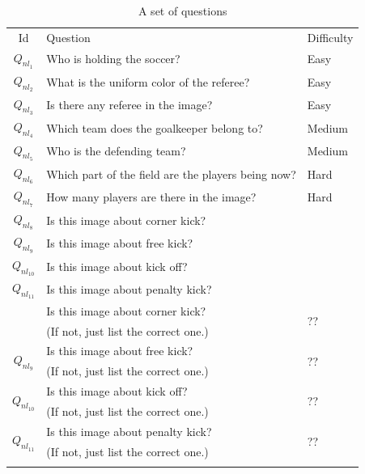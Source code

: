 \begin{table}[thb]
	\renewcommand{\arraystretch}{1}
	\begin{center}
		\footnotesize		
		\begin{tabular}{c|*{2}{l}}
			\Xhline{1pt}
			Id & Question                                           & Difficulty \\ \Xhline{0.7pt}
			$Q_{nl_1}$  & Who is holding the soccer?                         & Easy       \\ \hline
			$Q_{nl_2}$  & What is the uniform color of the referee?           & Easy       \\ \hline
			$Q_{nl_3}$  & Is there any referee in the image?                 & Easy       \\ \hline
			$Q_{nl_4}$  & Which team does the goalkeeper belong to?          & Medium       \\ \hline
			$Q_{nl_5}$  & Who is the defending team?                         & Medium       \\ \hline
			$Q_{nl_6}$  & Which part of the field are the players being now? & Hard       \\ \hline
			$Q_{nl_7}$  & How many players are there in the image?           & Hard     \\ \hline
			$Q_{nl_8}$  & Is this image about corner kick?                   & 
			\\ \hline
			$Q_{nl_9}$  & Is this image about free kick?                     & 
			\\ \hline
			$Q_{nl_{10}}$  & Is this image about kick off?                  & 
			\\ \hline
			$Q_{nl_{11}}$  &  Is this image about penalty kick?             &
			\\ \hline
			\eat{
			\multirow{2}{*}{$Q_{nl_8}$ }
			& Is this image about corner kick?           &  \multirow{2}{*}{\color{red}??}  \\ 
			& {\color{red}(If not, just list the correct one.)}  & \\ \hline
			
			\multirow{2}{*}{$Q_{nl_{9}}$}  &  Is this image about free kick?  &  \multirow{2}{*}{\color{red}??}    \\ 
			& {\color{red}(If not, just list the correct one.)}  &  \\ \hline
			
			\multirow{2}{*}{$Q_{nl_{10}}$}  &  Is this image about kick off?  &  \multirow{2}{*}{\color{red}??}    \\ 
			& {\color{red}(If not, just list the correct one.)}  &  \\ \hline
			
			\multirow{2}{*}{$Q_{nl_{11}}$}  &   Is this image about penalty kick?  &  \multirow{2}{*}{\color{red}??}    \\ 
			& {\color{red}(If not, just list the correct one.)}  &  \\ %
			\Xhline{1pt}
			}
		\end{tabular}
		\caption{A set of questions}
		\label{table:questions}
	\end{center}
\end{table}
